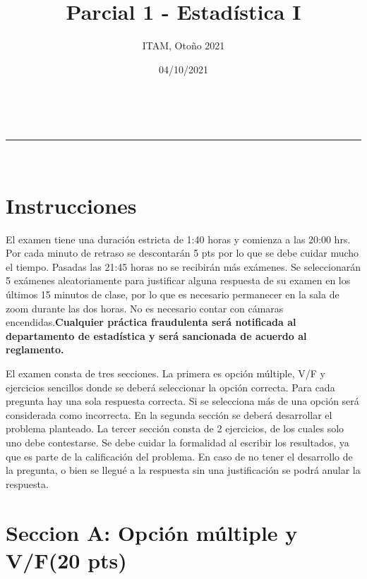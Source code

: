 \documentclass[addpoints]{exam}
\makeatletter
\newcommand{\linia}{\rule{\linewidth}{0.5pt}}
\theoremstyle{mytheor}
\renewcommand{\maketitle}{
    \begin{center}
    \vspace{2ex}
    {\huge \textsc{\@title}}
    \vspace{1ex}
    \\
    \linia\\
    \@author \hfill \@date
    \vspace{4ex}
    \end{center}
  }
\makeatother
\begin{document}
  
  \title{Parcial 1 - Estadística I}
  
  \author{ITAM, Otoño 2021}
  
  \date{04/10/2021}
  
  \maketitle
  
  \section*{Instrucciones}
  
El examen tiene una duración estricta de 1:40 horas y comienza a las 20:00 hrs. Por cada minuto de retraso se descontarán 5 pts por lo que se debe cuidar mucho el tiempo. Pasadas las 21:45 horas no se recibirán más exámenes. Se seleccionarán 5 exámenes aleatoriamente para justificar alguna respuesta de su examen en los últimos 15 minutos de clase, por lo que es necesario permanecer en la sala de zoom durante las dos horas. No es necesario contar con cámaras encendidas.\textbf{Cualquier práctica fraudulenta será notificada al departamento de estadística y será sancionada de acuerdo al reglamento.} 

El examen consta de tres secciones. La primera es opción múltiple, V/F y ejercicios sencillos donde se deberá seleccionar la opción correcta. Para cada pregunta hay una sola respuesta correcta. Si se selecciona más de una opción será considerada como incorrecta. En la segunda sección se deberá desarrollar el problema planteado. La tercer sección consta de 2 ejercicios, de los cuales solo uno debe contestarse. Se debe cuidar la formalidad al escribir los resultados, ya que es parte de la calificación del problema. En caso de no tener el desarrollo de la pregunta, o bien se llegué a la respuesta sin una justificación se podrá anular la respuesta.  

\vspace{10pt}
  

  
  \section*{Seccion A: Opción múltiple y V/F(20 pts)}
  
\end{document}
